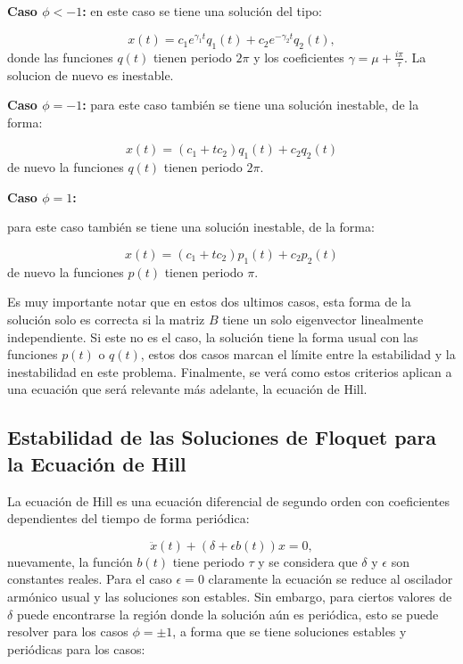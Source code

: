 \documentclass[a4paper,10pt]{report}
\begin{document}
\textbf{Caso $\phi < -1$:} en este caso se tiene una solución del tipo:

\begin{equation}
x(t) =c_1 e^{\gamma_1 t}q_1(t) + c_2 e^{-\gamma_2 t}q_2(t),
\end{equation} donde las funciones $q(t)$ tienen periodo $2\pi$ y los coeficientes $\gamma = \mu + \frac{i\pi}{\tau}$. La solucion de nuevo es inestable.

\textbf{Caso $\phi = -1$:} para este caso también se tiene una solución inestable, de la forma:

\begin{equation}
x(t) = (c_1 + tc_2)q_1(t) + c_2q_2(t)
\end{equation} de nuevo la funciones $q(t)$ tienen periodo $2\pi$.

\textbf{Caso $\phi = 1$:}

para este caso también se tiene una solución inestable, de la forma:

\begin{equation}
x(t) = (c_1 + tc_2)p_1(t) + c_2p_2(t)
\end{equation} de nuevo la funciones $p(t)$ tienen periodo $\pi$.

Es muy importante notar que en estos dos ultimos casos, esta forma de la solución solo es correcta si la matriz $B$ tiene un solo eigenvector linealmente independiente. Si este no es el caso, la solución tiene la forma usual con las funciones $p(t)$ o $q(t)$, estos dos casos marcan el límite entre la estabilidad y la inestabilidad en este problema. Finalmente, se verá como estos criterios aplican a una ecuación que será relevante más adelante, la ecuación de Hill.

\subsection{Estabilidad de las Soluciones de Floquet para la Ecuación de Hill}

La ecuación de Hill es una ecuación diferencial de segundo orden con coeficientes dependientes del tiempo de forma periódica\cite{WardFT}:

\begin{equation}
\ddot{x}(t) + (\delta + \epsilon b(t))x = 0,
\end{equation} nuevamente, la función $b(t)$ tiene periodo $\tau$ y se considera que $\delta$ y $\epsilon$ son constantes reales. Para el caso $\epsilon = 0$ claramente la ecuación se reduce al oscilador armónico usual y las soluciones son estables. Sin embargo, para ciertos valores de $\delta$ puede encontrarse la región donde la solución aún es periódica, esto se puede resolver para los casos $\phi = \pm 1$, a forma que se tiene soluciones estables y periódicas para los casos:
\end{document}
